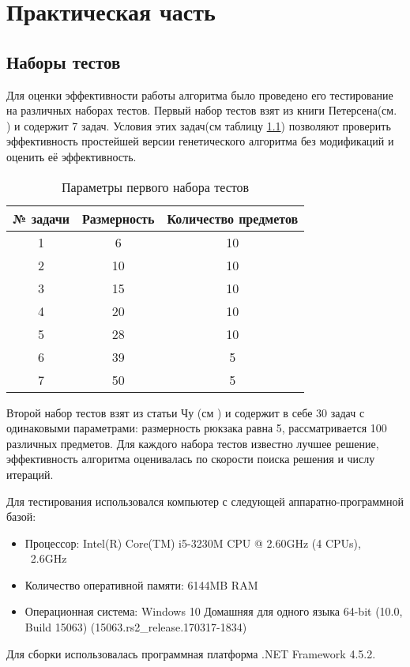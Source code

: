 \chapter{Практическая часть}

\section{Наборы тестов}

Для оценки эффективности работы алгоритма было проведено его тестирование на различных наборах тестов.
Первый набор тестов взят из книги Петерсена(см. \cite{Петерсен1967}) и содержит 7 задач. Условия этих задач(см таблицу \ref{table1}) позволяют проверить эффективность простейшей версии генетического алгоритма без модификаций и оценить её эффективность. %

\begin{table}[ht]%
\centering
\caption{Параметры первого набора тестов}
\label{table1}
\begin{tabular}{|c|c|c|}
\hline
№ задачи & Размерность & Количество предметов \\ \hline
1        & 6           & 10                   \\ \hline
2        & 10          & 10                   \\ \hline
3        & 15          & 10                   \\ \hline
4        & 20          & 10                   \\ \hline
5        & 28          & 10                   \\ \hline
6        & 39          & 5                    \\ \hline
7        & 50          & 5                    \\ \hline
\end{tabular}
\end{table}  

Второй набор тестов взят из статьи Чу (см \cite{Чу1998}) и содержит в себе 30 задач с одинаковыми параметрами: размерность рюкзака равна 5, рассматривается 100 различных предметов.
Для каждого набора тестов известно лучшее решение, эффективность алгоритма оценивалась по скорости поиска решения и числу итераций. 

Для тестирования использовался компьютер с следующей аппаратно-программной базой:
\begin{itemize}
\item {Процессор: Intel(R) Core(TM) i5-3230M CPU @ 2.60GHz (4 CPUs), ~2.6GHz}
\item {Количество оперативной памяти: 6144MB RAM}
\item {Операционная система: Windows 10 Домашняя для одного языка 64-bit (10.0, Build 15063) (15063.rs2\_release.170317-1834)}
\end{itemize}
Для сборки использовалась программная платформа .NET Framework 4.5.2.
